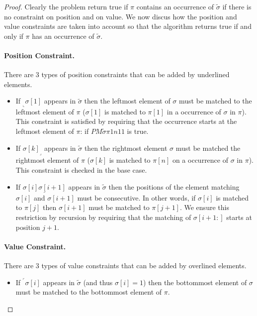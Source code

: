 \documentclass[a4paper]{llncs}
\newcommand{\ptext}{\pi}
\newcommand{\ppattern}{\sigma}
\newcommand{\PM}{PM}
\begin{document}
\begin{proof}
Clearly the problem return true if $\pi$ contains an
occurrence of $\widetilde{\sigma}$ if there is no constraint on position
and on value.
We now discus how the position and value constraints
are taken into account so that the algorithm
returns true if and only if $\pi$ has an occurrence
of $\widetilde{\sigma}$.

\paragraph{Position Constraint.} There are 3 types of position constraints that can be added by underlined elements.
\begin{itemize}
	\item If $_\llcorner{\sigma[1]}$ appears in $\widetilde{\sigma}$ then the leftmost element of $\sigma$  must be matched to the leftmost element of $\pi$ ($\ppattern[1]$ is matched to $\ptext[1]$ in a occurrence of $\ppattern$ in $\ptext$). This constraint is satisfied by requiring that the occurrence starts at the leftmost element of $\ptext$: if  $\PM{\widetilde{\sigma}}{\ptext}{1}{n}{1}{1}$ is true.

	\item If ${\ppattern[k]}_\lrcorner$ appears in $\widetilde{\sigma}$ then the rightmost element $\sigma$ must be matched the rightmost element of $\pi$ ($\ppattern[k]$ is matched to $\ptext[n]$ on a occurrence of $\ppattern$ in $\ptext$). This constraint is checked in the base case.

	\item If $\underline{\ppattern[i]\ppattern[i+1]}$ appears in $\widetilde{\sigma}$ then the positions of the element matching $\ppattern[i]$ and $\ppattern[i+1]$ must be consecutive. In other words, if $\ppattern[i]$ is matched to $\ptext[j]$ then $\ppattern[i+1]$ must be matched to $\ptext[j+1]$. We ensure this restriction by recursion by requiring that the matching of $\ppattern[i+1:]$ starts at position $j+1$.
\end{itemize}

\paragraph{Value Constraint.} There are 3 types of value constraints that can be added by overlined elements.
\begin{itemize}
	\item If $^\ulcorner{\sigma[i]}$ appears in $\widetilde{\sigma}$ (and thus $\sigma[i]=1$) then the bottommost element of $\ppattern$ must be matched to the bottommost element of $\ptext$.
	\begin{itemize}


\end{itemize}
\end{itemize}
\end{proof}
\end{document}
